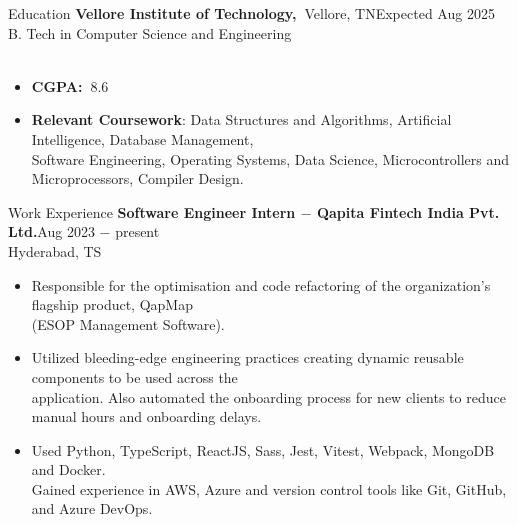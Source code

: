 \documentclass{resume}
\begin{document}
\vspace{-\baselineskip}


\begin{rSection}{Education}
    \textbf{Vellore Institute of Technology,~}{Vellore, TN}\hfill {Expected Aug 2025}
    \\ {B. Tech in Computer Science and Engineering}\\ \
    \vspace{-\parskip}
    \vspace{-\parsep}
    \begin{itemize}
        \vspace{-0.5\baselineskip}
        \item {
              \textbf{CGPA:~}{8.6}
              }
        \item {
              \textbf{Relevant Coursework}: {Data Structures and Algorithms, Artificial Intelligence, Database Management, \\
              Software Engineering, Operating Systems, Data Science, Microcontrollers and Microprocessors, Compiler Design.}
              }
    \end{itemize}
\end{rSection}


\vspace{-0.5\baselineskip}


\begin{rSection}{Work Experience}
    {\textbf{Software Engineer Intern $-$ Qapita Fintech India Pvt. Ltd.}}\hfill Aug 2023 $-$ present\\
    {Hyderabad, TS}
    \vspace{-0.5\baselineskip}
    \begin{itemize}
        \item {
              Responsible for the optimisation and code refactoring of the organization's flagship product, QapMap \\
              (ESOP Management Software).
              }
        \item {
              Utilized bleeding-edge engineering practices creating dynamic reusable components to be used across the \\
              application. Also automated the onboarding process for new clients to reduce manual hours and onboarding delays.
              }
        \item {
              Used Python, TypeScript, ReactJS, Sass, Jest, Vitest, Webpack, MongoDB and Docker. \\
              Gained experience in AWS, Azure and version control tools like Git, GitHub, and Azure DevOps.
              }
    \end{itemize}
\end{rSection}
\end{document}
